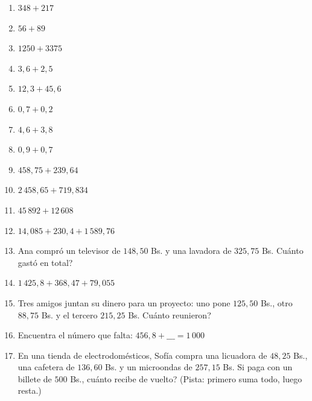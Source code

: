 \documentclass[12pt, letterpaper]{article}
\begin{document}
\begin{enumerate}[leftmargin=*]
  \item \facil{} $348 + 217$

  \item \facil{} $56 + 89$

  \item \facil{} $1250 + 3375$

  \item \facil{} $3{,}6 + 2{,}5$ %

  \item \facil{} $12{,}3 + 45{,}6$

  \item \facil{} $0{,}7 + 0{,}2$

  \item \facil{} $4{,}6 + 3{,}8$ %

  \item \facil{} $0{,}9 + 0{,}7$ %

  \item \medio{} $458{,}75 + 239{,}64$

  \item \medio{} $2\,458{,}65 + 719{,}834$

  \item \medio{} $45\,892 + 12\,608$

  \item \medio{} $14{,}085 + 230{,}4 + 1\,589{,}76$

  \item \medio{} Ana compró un televisor de $148{,}50$ Bs. y una lavadora de $325{,}75$ Bs. \textquestiondown Cuánto gastó en total?

  \item \medio{} $1\,425{,}8 + 368{,}47 + 79{,}055$

  \item \medio{} Tres amigos juntan su dinero para un proyecto: uno pone $125{,}50$ Bs., otro $88{,}75$ Bs. y el tercero $215{,}25$ Bs. \textquestiondown Cuánto reunieron?

  \item \medio{} Encuentra el número que falta: $456{,}8 + \_\_\_ = 1\,000$

  \item \dificil{} En una tienda de electrodomésticos, Sofía compra una licuadora de $48{,}25$ Bs., una cafetera de $136{,}60$ Bs. y un microondas de $257{,}15$ Bs. Si paga con un billete de $500$ Bs., \textquestiondown cuánto recibe de vuelto? (Pista: primero suma todo, luego resta.)


\end{enumerate}
\end{document}
